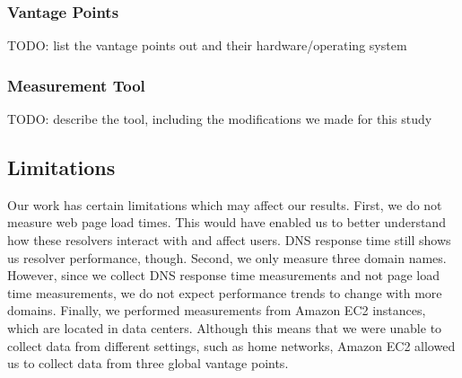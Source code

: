\subsubsection{Vantage Points}
TODO: list the vantage points out and their hardware/operating system

\subsubsection{Measurement Tool}
TODO: describe the tool, including the modifications we made for this study

\subsection{Limitations}
Our work has certain limitations which may affect our results. 
First, we do not measure web page load times. 
This would have enabled us to better understand how these resolvers interact with and affect users. 
DNS response time still shows us resolver performance, though. 
Second, we only measure three domain names. 
However, since we collect DNS response time measurements and not page load time measurements, we do not expect performance trends to change with more domains.
Finally, we performed measurements from Amazon EC2 instances, which are located in data centers. 
Although this means that we were unable to collect data from different settings, such as home networks, Amazon EC2 allowed us to collect data from three global vantage points. 
